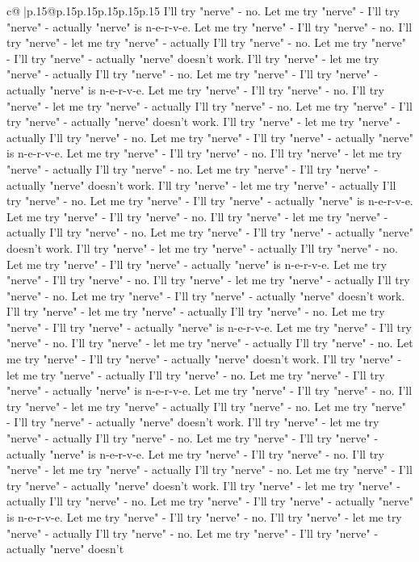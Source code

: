 \documentclass{article}
\begin{document}
{\begin{supertabular}{c@{$\;$}|p{.15\linewidth}@{}p{.15\linewidth}p{.15\linewidth}p{.15\linewidth}p{.15\linewidth}p{.15\linewidth}}
{{{I'll try "nerve" {-} no. Let me try "nerve" {-} I'll try "nerve" {-} actually "nerve" is n{-}e{-}r{-}v{-}e. Let me try "nerve" {-} I'll try "nerve" {-} no. I'll try "nerve" {-} let me try "nerve" {-} actually I'll try "nerve" {-} no. Let me try "nerve" {-} I'll try "nerve" {-} actually "nerve" doesn't work. I'll try "nerve" {-} let me try "nerve" {-} actually I'll try "nerve" {-} no. Let me try "nerve" {-} I'll try "nerve" {-} actually "nerve" is n{-}e{-}r{-}v{-}e. Let me try "nerve" {-} I'll try "nerve" {-} no. I'll try "nerve" {-} let me try "nerve" {-} actually I'll try "nerve" {-} no. Let me try "nerve" {-} I'll try "nerve" {-} actually "nerve" doesn't work. I'll try "nerve" {-} let me try "nerve" {-} actually I'll try "nerve" {-} no. Let me try "nerve" {-} I'll try "nerve" {-} actually "nerve" is n{-}e{-}r{-}v{-}e. Let me try "nerve" {-} I'll try "nerve" {-} no. I'll try "nerve" {-} let me try "nerve" {-} actually I'll try "nerve" {-} no. Let me try "nerve" {-} I'll try "nerve" {-} actually "nerve" doesn't work. I'll try "nerve" {-} let me try "nerve" {-} actually I'll try "nerve" {-} no. Let me try "nerve" {-} I'll try "nerve" {-} actually "nerve" is n{-}e{-}r{-}v{-}e. Let me try "nerve" {-} I'll try "nerve" {-} no. I'll try "nerve" {-} let me try "nerve" {-} actually I'll try "nerve" {-} no. Let me try "nerve" {-} I'll try "nerve" {-} actually "nerve" doesn't work. I'll try "nerve" {-} let me try "nerve" {-} actually I'll try "nerve" {-} no. Let me try "nerve" {-} I'll try "nerve" {-} actually "nerve" is n{-}e{-}r{-}v{-}e. Let me try "nerve" {-} I'll try "nerve" {-} no. I'll try "nerve" {-} let me try "nerve" {-} actually I'll try "nerve" {-} no. Let me try "nerve" {-} I'll try "nerve" {-} actually "nerve" doesn't work. I'll try "nerve" {-} let me try "nerve" {-} actually I'll try "nerve" {-} no. Let me try "nerve" {-} I'll try "nerve" {-} actually "nerve" is n{-}e{-}r{-}v{-}e. Let me try "nerve" {-} I'll try "nerve" {-} no. I'll try "nerve" {-} let me try "nerve" {-} actually I'll try "nerve" {-} no. Let me try "nerve" {-} I'll try "nerve" {-} actually "nerve" doesn't work. I'll try "nerve" {-} let me try "nerve" {-} actually I'll try "nerve" {-} no. Let me try "nerve" {-} I'll try "nerve" {-} actually "nerve" is n{-}e{-}r{-}v{-}e. Let me try "nerve" {-} I'll try "nerve" {-} no. I'll try "nerve" {-} let me try "nerve" {-} actually I'll try "nerve" {-} no. Let me try "nerve" {-} I'll try "nerve" {-} actually "nerve" doesn't work. I'll try "nerve" {-} let me try "nerve" {-} actually I'll try "nerve" {-} no. Let me try "nerve" {-} I'll try "nerve" {-} actually "nerve" is n{-}e{-}r{-}v{-}e. Let me try "nerve" {-} I'll try "nerve" {-} no. I'll try "nerve" {-} let me try "nerve" {-} actually I'll try "nerve" {-} no. Let me try "nerve" {-} I'll try "nerve" {-} actually "nerve" doesn't work. I'll try "nerve" {-} let me try "nerve" {-} actually I'll try "nerve" {-} no. Let me try "nerve" {-} I'll try "nerve" {-} actually "nerve" is n{-}e{-}r{-}v{-}e. Let me try "nerve" {-} I'll try "nerve" {-} no. I'll try "nerve" {-} let me try "nerve" {-} actually I'll try "nerve" {-} no. Let me try "nerve" {-} I'll try "nerve" {-} actually "nerve" doesn't }}}
\end{supertabular}}
\end{document}
